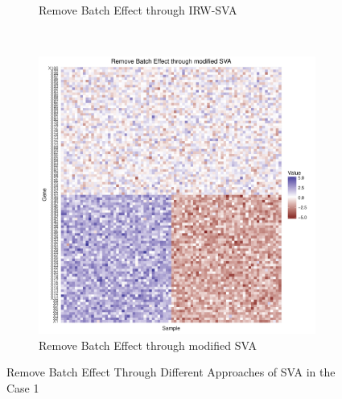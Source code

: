 \documentclass[11pt]{article}
\begin{document}
\begin{figure}[h!]
\begin{subfigure}[b]{0.3\textwidth}
        \caption{Remove Batch Effect through IRW-SVA}
    \end{subfigure}  %
~
    \begin{subfigure}[b]{0.3\textwidth}
        \centering
        \includegraphics[width = \textwidth]{figures/new_sva4.pdf}
        \caption{Remove Batch Effect through modified SVA}
    \end{subfigure}    
    \caption{Remove Batch Effect Through Different Approaches of SVA in the Case 1}
\end{figure}
\end{document}
